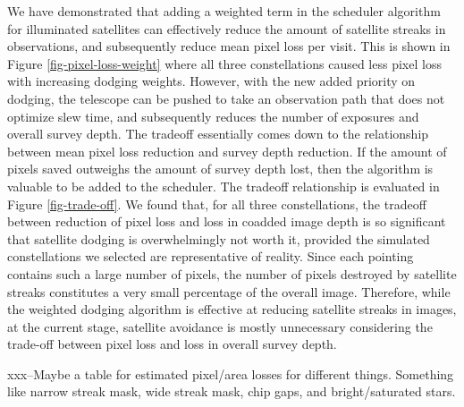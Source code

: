 \documentclass[linenumbers]{aastex631}
\begin{document}
We have demonstrated that adding a weighted term in the scheduler algorithm for
illuminated satellites can effectively reduce the amount of satellite streaks in observations, and
subsequently reduce mean pixel loss per visit. This is shown in Figure \ref{fig-pixel-loss-weight} where all three
constellations caused less pixel loss with increasing dodging weights. However, with the new
added priority on dodging, the telescope can be pushed to take an observation path that does not
optimize slew time, and subsequently reduces the number of exposures and overall survey depth.
The tradeoff essentially comes down to the relationship between mean pixel loss
reduction and survey depth reduction. If the amount of pixels saved outweighs the amount of
survey depth lost, then the algorithm is valuable to be added to the scheduler. The tradeoff
relationship is evaluated in Figure \ref{fig-trade-off}. We found that, for all three constellations, the tradeoff
between reduction of pixel loss and loss in coadded image depth is so significant that satellite
dodging is overwhelmingly not worth it, provided the simulated constellations we selected are
representative of reality. Since each pointing contains such a large number of pixels, the number
of pixels destroyed by satellite streaks constitutes a very small percentage of the overall image.
Therefore, while the weighted dodging algorithm is effective at reducing satellite streaks in
images, at the current stage, satellite avoidance is mostly unnecessary considering the trade-off
between pixel loss and loss in overall survey depth.

xxx--Maybe a table for estimated pixel/area losses for different things. Something like narrow streak mask, wide streak mask, chip gaps, and bright/saturated stars. 
\end{document}

